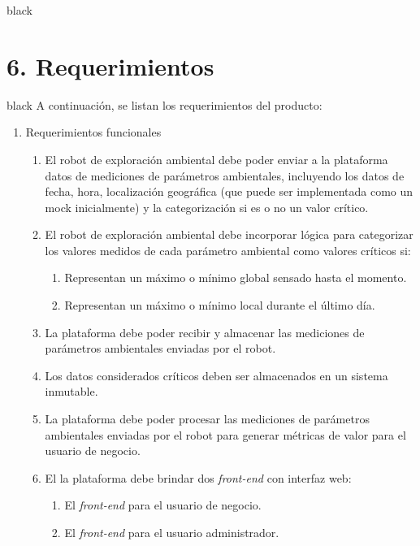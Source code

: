 \documentclass[
11pt, %
]{charter}
\begin{document}
\begin{consigna}{black}
\end{consigna}

\section{6. Requerimientos}
\label{sec:requerimientos}
\begin{consigna}{black}
A continuación, se listan los requerimientos del producto:

\begin{enumerate}	
	\item Requerimientos funcionales		
	\begin{enumerate}	
		
		\item El robot de exploración ambiental debe poder enviar a la plataforma datos de mediciones de parámetros ambientales, incluyendo los datos de fecha, hora, localización geográfica (que puede ser implementada como un mock inicialmente) y la categorización si es o no un valor crítico.
		\item El robot de exploración ambiental debe incorporar lógica para categorizar los valores medidos de cada parámetro ambiental como valores críticos si:
		\begin{enumerate}				
			\item Representan un máximo o mínimo global sensado hasta el momento.				
			\item Representan un máximo o mínimo local durante el último día.				
		\end{enumerate}			
		\item La plataforma debe poder recibir y almacenar las mediciones de parámetros ambientales enviadas por el robot.
		\item Los datos considerados críticos deben ser almacenados en un sistema inmutable.
		\item La plataforma debe poder procesar las mediciones de parámetros ambientales enviadas por el robot para generar métricas de valor para el usuario de negocio.		
		\item El la plataforma debe brindar dos \textit{front-end} con interfaz web:
			\begin{enumerate}				
				\item El \textit{front-end} para el usuario de negocio.				
				\item El \textit{front-end} para el usuario administrador.				
			\end{enumerate}			
		

\end{enumerate}
\end{enumerate}
\end{consigna}
\end{document}
